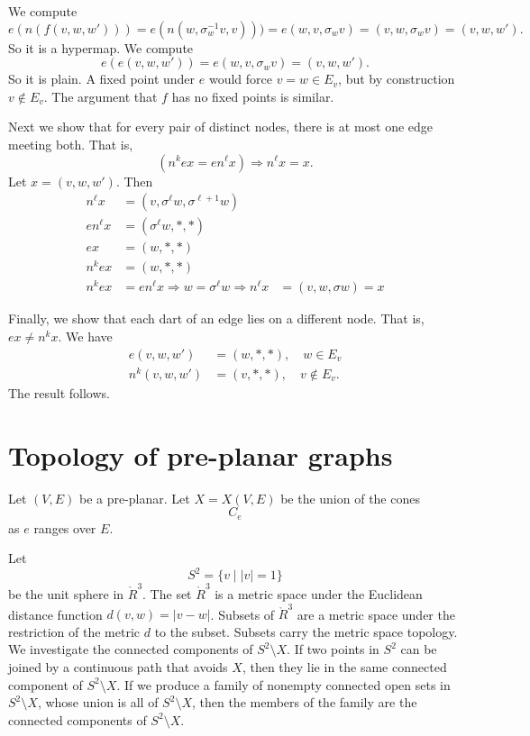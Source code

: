 \begin{lemma}  We compute
    $$e(n(f(v,w,w'))) = e(n(w,\sigma_w^{-1} v,v))) =
        e(w,v,\sigma_w v) = (v,w,\sigma_w v) = (v,w,w').$$
So it is a hypermap. We compute
    $$e(e(v,w,w')) = e(w,v,\sigma_w v) = (v,w,w').$$
So it is plain. A fixed point under $e$ would force $v = w\in E_v$,
but by construction $v\not\in E_v$.  The argument that $f$ has no
fixed points is similar.

    Next we show that for every pair of distinct nodes, there is at
most one edge meeting both.  That is,
        $$(n^k e x = e n^\ell x)\Rightarrow n^\ell x = x.$$
Let $x = (v,w,w')$.  Then
    $$
    \begin{array}{lll}
    n^\ell x &= (v,\sigma^\ell w,\sigma^{\ell+1}w)\\
    e n^\ell x &= (\sigma^\ell w,*,*)\\
    e x &= (w,*,*)\\
    n^k e x &= (w,*,*)\\
    n^k e x &= e n^\ell x \Rightarrow w = \sigma^\ell w \Rightarrow
    n^\ell x &= (v,w,\sigma w) = x
    \end{array}
    $$

Finally, we show that each dart of an edge lies on a different node.
That is, $e x \ne n^k x$.  We have
    $$
    \begin{array}{lll}
        e(v,w,w') &= (w,*,*),\quad w\in E_v\\
        n^k(v,w,w') &= (v,*,*),\quad v\not\in E_v.
    \end{array}
    $$
The result follows.
\end{lemma}

\section{Topology of pre-planar graphs}

Let $(V,E)$ be a pre-planar.  Let $X=X(V,E)$ be the union of the
cones
    $$C_e$$
as $e$ ranges over $E$.

Let $$S^2 = \{ v \mid | v | = 1\}$$ be the unit sphere in
$\ring{R}^3$.  The set $\ring{R}^3$ is a metric space under the
Euclidean distance function $d(v,w) = |v-w|$.  Subsets of
$\ring{R}^3$ are a metric space under the restriction of the metric
$d$ to the subset. Subsets carry the metric space topology.  We
investigate the connected components of $S^2\setminus X$.  If two
points in $S^2$ can be joined by a continuous path that avoids $X$,
then they lie in the same connected component of $S^2\setminus X$.
If we produce a family of nonempty connected open sets in
$S^2\setminus X$, whose union is all of $S^2\setminus X$, then the
members of the family are the connected components of $S^2\setminus
X$.

